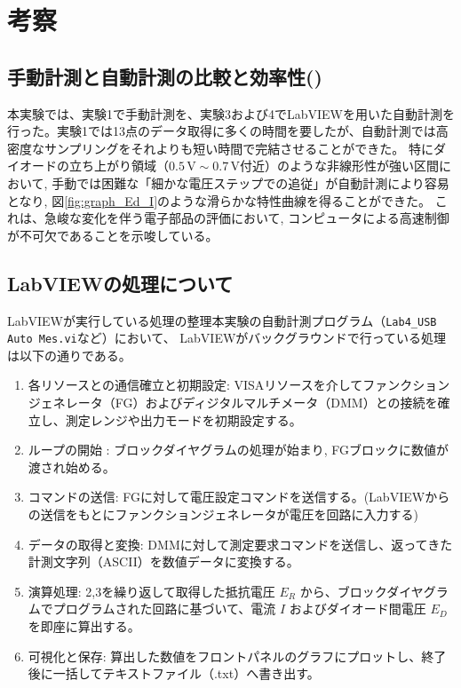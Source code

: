 \section{考察}

\subsection{手動計測と自動計測の比較と効率性()}
本実験では、実験1で手動計測を、実験3および4でLabVIEWを用いた自動計測を行った。実験1では13点のデータ取得に多くの時間を要したが、自動計測では高密度なサンプリングをそれよりも短い時間で完結させることができた。
特にダイオードの立ち上がり領域（$0.5\,\mathrm{V} \sim 0.7\,\mathrm{V}$付近）のような非線形性が強い区間において,
手動では困難な「細かな電圧ステップでの追従」が自動計測により容易となり,
図\ref{fig:graph_Ed_I}のような滑らかな特性曲線を得ることができた。
これは、急峻な変化を伴う電子部品の評価において,
コンピュータによる高速制御が不可欠であることを示唆している。

\subsection{LabVIEWの処理について}
LabVIEWが実行している処理の整理本実験の自動計測プログラム（\texttt{Lab4\_USB Auto Mes.vi}など）において、
LabVIEWがバックグラウンドで行っている処理は以下の通りである。
\begin{enumerate}
\item 各リソースとの通信確立と初期設定: VISAリソースを介してファンクションジェネレータ（FG）およびディジタルマルチメータ（DMM）との接続を確立し、測定レンジや出力モードを初期設定する。
\item ループの開始 : ブロックダイヤグラムの処理が始まり, FGブロックに数値が渡され始める。
\item コマンドの送信: FGに対して電圧設定コマンドを送信する。(LabVIEWからの送信をもとにファンクションジェネレータが電圧を回路に入力する)
\item データの取得と変換: DMMに対して測定要求コマンドを送信し、返ってきた計測文字列（ASCII）を数値データに変換する。
\item 演算処理: 2,3を繰り返して取得した抵抗電圧 $E_R$ から、ブロックダイヤグラムでプログラムされた回路に基づいて、電流 $I$ およびダイオード間電圧 $E_D$ を即座に算出する。
\item 可視化と保存: 算出した数値をフロントパネルのグラフにプロットし、終了後に一括してテキストファイル（.txt）へ書き出す。
\end{enumerate}

